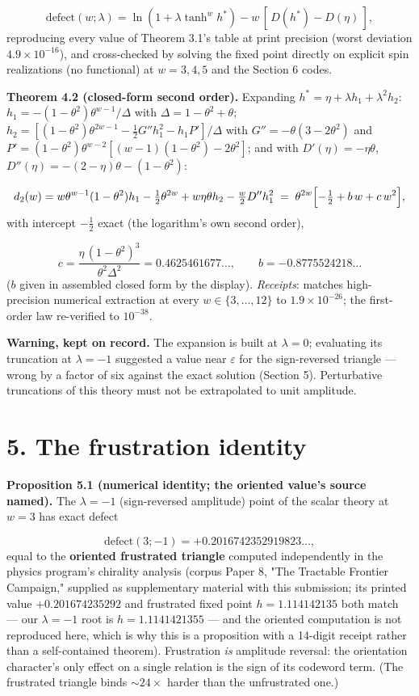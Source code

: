 \documentclass[11pt]{article}
\begin{document}
\[
\mathrm{defect}(w;\lambda) = \ln(1+\lambda \tanh^w h^*)
- w\,[\,D(h^*) - D(\eta)\,],
\]
reproducing every value of Theorem 3.1's table at print precision (worst deviation $4.9\times 10^{-16}$), and cross-checked by solving the fixed point directly on explicit spin realizations (no functional) at $w = 3, 4, 5$ and the Section 6 codes.

\textbf{Theorem 4.2 (closed-form second order).}  Expanding $h^* = \eta + \lambda h_1 + \lambda^2 h_2$: $h_1 = -(1-\theta^2)\theta^{w-1}/\Delta$ with $\Delta = 1-\theta^2+\theta$; $h_2 = [(1-\theta^2)\theta^{2w-1} - \tfrac12 G''h_1^2 - h_1 P']/\Delta$ with $G'' = -\theta(3-2\theta^2)$ and $P' = (1-\theta^2)\theta^{w-2}[(w-1)(1-\theta^2) - 2\theta^2]$; and with $D'(\eta) = -\eta\theta$, $D''(\eta) = -(2-\eta)\theta - (1-\theta^2)$:

\[
d_2(w) = w\theta^{w-1}(1-\theta^2)h_1 - \tfrac12\theta^{2w}
+ w\eta\theta h_2 - \tfrac{w}{2}D''h_1^2
\;=\; \theta^{2w}\Bigl[-\tfrac12 + b\,w + c\,w^2\Bigr],
\]
with intercept $-\tfrac12$ exact (the logarithm's own second order),

\[
c = \frac{\eta\,(1-\theta^2)^3}{\theta^2\Delta^2}
= 0.4625461677\ldots, \qquad
b = -0.8775524218\ldots
\]
($b$ given in assembled closed form by the display).  \emph{Receipts}: matches high-precision numerical extraction at every $w \in \{3,\ldots,12\}$ to $1.9\times 10^{-26}$; the first-order law re-verified to $10^{-38}$.

\textbf{Warning, kept on record.}  The expansion is built at $\lambda = 0$; evaluating its truncation at $\lambda = -1$ suggested a value near $\varepsilon$ for the sign-reversed triangle — wrong by a factor of six against the exact solution (Section 5).  Perturbative truncations of this theory must not be extrapolated to unit amplitude.

\section*{5. The frustration identity}
\textbf{Proposition 5.1 (numerical identity; the oriented value's source named).}  The $\lambda = -1$ (sign-reversed amplitude) point of the scalar theory at $w = 3$ has exact defect

\[
\mathrm{defect}(3; -1) = +0.2016742352919823\ldots,
\]
equal to the \textbf{oriented frustrated triangle} computed independently in the physics program's chirality analysis (corpus Paper 8, "The Tractable Frontier Campaign," supplied as supplementary material with this submission; its printed value $+0.201674235292$ and frustrated fixed point $h = 1.114142135$ both match — our $\lambda = -1$ root is $h = 1.1141421355$ — and the oriented computation is not reproduced here, which is why this is a proposition with a 14-digit receipt rather than a self-contained theorem).  Frustration \emph{is} amplitude reversal: the orientation character's only effect on a single relation is the sign of its codeword term.  (The frustrated triangle binds $\sim 24\times$ harder than the unfrustrated one.)
\end{document}
